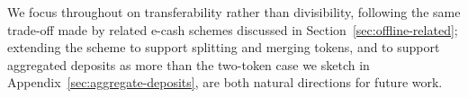 We focus throughout on transferability rather than divisibility, following
the same trade-off made by related e-cash schemes discussed in
Section~\ref{sec:offline-related}; extending the scheme to support splitting
and merging tokens, and to support aggregated deposits as more than the
two-token case we sketch in Appendix~\ref{sec:aggregate-deposits}, are both
natural directions for future work.
